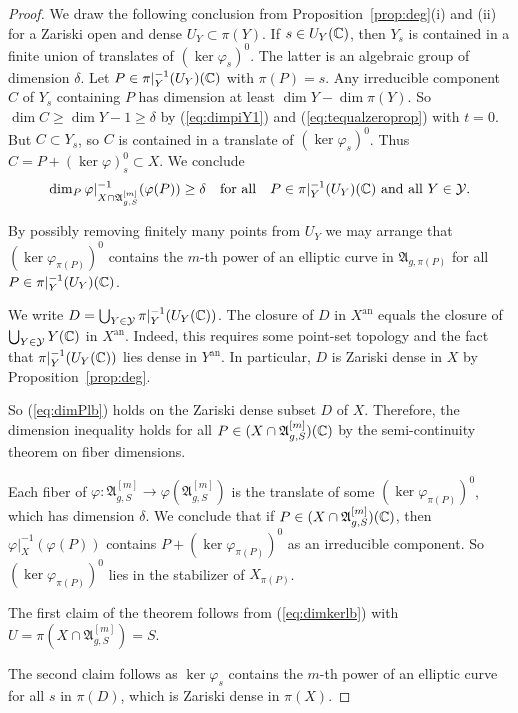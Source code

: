 \documentclass[12pt,oneside]{amsart}
\begin{document}
\begin{proof}
  We draw the following conclusion from Proposition~\ref{prop:deg}(i)
  and (ii) for a Zariski open and dense $U_Y\subset\pi(Y)$.
  If $s\in U_Y({\mathbb{C}})$, then $Y_s$ is contained in a finite
  union of translates of $(\ker\varphi_s)^0$. The latter is an algebraic
  group of dimension $\delta$. Let $P \in \pi|_Y^{-1}(U_Y)({\mathbb{C}})$ with
  $\pi(P)=s$. Any irreducible component $C$ of $Y_s$ containing $P$ has
  dimension at least $\dim Y - \dim\pi(Y)$. So $\dim C\ge \dim Y -1 \ge
  \delta$ by (\ref{eq:dimpiY1}) and (\ref{eq:tequalzeroprop}) with $t=0$. But
  $C\subset Y_s$, so $C$ is contained in a translate of $(\ker
  \varphi_s)^0$. Thus $C = P +(\ker\varphi)^0_{s} \subset X$. We
  conclude
  \begin{equation}
    \label{eq:dimPlb}
    \dim_P \varphi|_{X\cap \mathfrak{A}_{g,S}^{[m]}}^{-1}(\varphi(P)) \ge \delta \quad\text{for
      all}\quad
    P\in \pi|_Y^{-1}(U_Y)({\mathbb{C}})\text{ and all }Y\in{\mathcal Y}.
  \end{equation}
  

  
  By possibly removing finitely many points from  $U_Y$
  we may arrange that
  $(\ker\varphi_{\pi(P)})^0$ contains the
  $m$-th power of
  an elliptic curve in $ \mathfrak{A}_{g,\pi(P)}$ for all $P\in
  \pi|_Y^{-1}(U_Y)({\mathbb{C}})$.  

  We write $D = \bigcup_{Y\in {\mathcal Y}} \pi|_{Y}^{-1}(U_Y({\mathbb{C}}))$. 
  The closure of $D$ in $X^{\mathrm{an}}$ equals the closure of 
  $\bigcup_{Y\in {\mathcal Y}} Y({\mathbb{C}})$ in $X^{\mathrm{an}}$.
  Indeed, this requires some point-set topology and the fact that
  $\pi|_{Y}^{-1}(U_Y({\mathbb{C}}))$ lies dense in $Y^{\mathrm{an}}$.
  In particular, $D$ is Zariski dense in $X$ by
  Proposition~\ref{prop:deg}. 


  So (\ref{eq:dimPlb}) holds on the Zariski dense subset $D$ of $X$.
  Therefore, the dimension inequality
  holds for all $P\in (X\cap\mathfrak{A}_{g,S}^{[m]})({\mathbb{C}})$ by the semi-continuity theorem
  on fiber dimensions.  

  Each fiber of $\varphi \colon \mathfrak{A}_{g,S}^{[m]}\rightarrow \varphi(\mathfrak{A}_{g,S}^{[m]})$
  is the translate of some $(\ker\varphi_{\pi(P)})^0$, which has
  dimension $\delta$.
  We conclude that if $P\in (X\cap\mathfrak{A}_{g,S}^{[m]})({\mathbb{C}})$, then
  $\varphi|_X^{-1}(\varphi(P))$ contains $P+(\ker\varphi_{\pi(P)})^0$
  as an irreducible component. So $(\ker\varphi_{\pi(P)})^0$ lies in
  the stabilizer of $X_{\pi(P)}$.
  
  The first claim of the theorem follows from (\ref{eq:dimkerlb}) with
  $U=\pi(X\cap \mathfrak{A}_{g,S}^{[m]}) = S$. 

  The second claim follows as $\ker\varphi_s$ contains the $m$-th power
  of an elliptic curve for all  $s$ in $\pi(D)$, which is Zariski
  dense in $\pi(X)$.
\end{proof}
\end{document}
